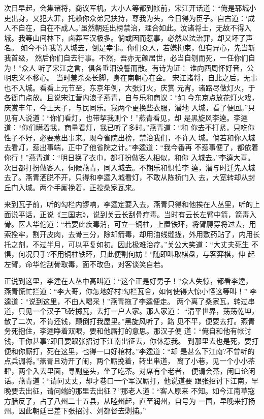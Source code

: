 次日早起，会集诸将，商议军机，大小人等都到帐前，宋江开话道：“俺是郓城小
吏出身，又犯大罪，托赖你众弟兄扶持，尊我为头，今日得为臣子。自古道：‘成
人不自在，自在不成人。’虽然朝廷出榜禁治，理合如此。汝诸将士，无故不得入
城。我等山间林下，卤莽军汉极多。倘或因而惹事，必然以法治罪，却又坏了声名。
如今不许我等入城去，倒是幸事。你们众人，若嫌拘束，但有异心，先当斩我首级，
然后你们自去行事。不然，吾亦无颜居世，必当自刎而死，一任你们自为！”众人
听了宋江之言，俱各垂泪设誓而散。有诗为证：
谁向西周怀好音，公明忠义不移心。
当时羞杀秦长脚，身在南朝心在金。
宋江诸将，自此之后，无事也不入城。看看上元节至，东京年例，大张灯火，庆赏
元宵，诸路尽做灯火，于各衙门点放。且说宋江营内浪子燕青，自与乐和商议：“如
今东京点放花灯火戏，庆赏丰年，今上天子，与民同乐。我两个更换些衣服，潜地
入城，看了便回。”只见有人说道：“你们看灯，也带挈我则个！”燕青看见，却
是黑旋风李逵。李逵道：“你们瞒着我，商量看灯，我已听了多时。”燕青道：“和
你去不打紧，只吃你性子不好，必要惹出事来。现今省院出榜，禁治我们，不许入
城。倘若和你入城去看灯，惹出事端，正中了他省院之计。”李逵道：“我今番再
不惹事便了，都依着你行！”燕青道：“明日换了衣巾，都打扮做客人相似，和你
入城去。”李逵大喜。次日都打扮做客人，伺候燕青，同入城去。不期乐和惧怕李
逵，潜与时迁先入城去了。燕青洒脱不开，只得和李逵入城看灯，不敢从陈桥门入
去，大宽转却从封丘门入城。两个手厮挽着，正投桑家瓦来。

来到瓦子前，听的勾栏内锣响，李逵定要入去，燕青只得和他挨在人丛里，听的上
面说平话，正说《三国志》，说到关云长刮骨疗毒。当时有云长左臂中箭，箭毒入
骨。医人华佗道：“若要此疾毒消，可立一铜柱，上置铁环，将臂膊穿将过去，用
索拴牢，割开皮肉，去骨三分，除却箭毒，却用油线缝拢，外用敷药贴了，内用长
托之剂，不过半月，可以平复如初。因此极难治疗。”关公大笑道：“大丈夫死生
不惧，何况只手?不用铜柱铁环，只此便割何妨！”随即叫取棋盘，与客弈棋，伸
起左臂，命华佗刮骨取毒，面不改色，对客谈笑自若。

正说到这里，李逵在人丛中高叫道：“这个正是好男子！”众人失惊，都看李逵，
燕青慌忙拦道：“李大哥，你怎地好村!勾栏瓦舍，如何使得大惊小怪这等叫！”
李逵道：“说到这里，不由人喝采！”燕青拖了李逵便走。
两个离了桑家瓦，转过串道，只见一个汉子飞砖掷瓦，去打一户人家。那人家道：
“清平世界，荡荡乾坤，散了二次，不肯还钱，颠倒打我屋里。”黑旋风听了，路
见不平，便要去打。燕青务死抱住，李逵睁着双眼，要和他厮打的意思。那汉子便
道：“俺自和他有帐讨钱，干你甚事?即日要跟张招讨下江南出征去，你休惹我。
到那里去也是死，要打便和你厮打，死在这里，也得一口好棺材。”李逵道：“却
是甚么下江南?不曾听的点兵调将。”燕青且劝开了闹，两个厮挽着，转出串道，
离了小巷，见一个小小茶肆，两个入去里面，寻副座头，坐了吃茶。对席有个老者，
便请会茶，闲口论闲话。燕青道：“请问丈丈，却才巷口一个军汉厮打，他说道要
跟张招讨下江南，早晚要去出征，请问端的那里去出征？”那老人道：“客人原来
不知。如今江南草寇方腊反了，占了八州二十五县，从睦州起，直至润州，自号为
一国，早晚来打扬州。因此朝廷已差下张招讨、刘都督去剿捕。”

